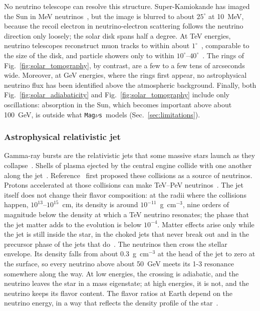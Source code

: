 \documentclass[final,5p,times,twocolumn,sort,compress]{elsarticle}
\makeatletter
\newcommand{\fig}{Fig.}
\DeclareRobustCommand{\_}{%
  \ifmmode\nfss@text{\textunderscore}\else\textunderscore\allowbreak\fi}
\newcommand{\figu}[1]{\fig~\ref{fig:#1}}
\newcommand{\magnus}{{\tt Mag}\ensuremath{\nu}{\tt s}}
\makeatother
\begin{document}
No neutrino telescope can resolve this structure. Super-Kamiokande has imaged the Sun in MeV neutrinos~\cite{Super-Kamiokande:2005wtt}, but the image is blurred to about $25^\circ$ at 10~MeV, because the recoil electron in neutrino-electron scattering follows the neutrino direction only loosely; the solar disk spans half a degree. At TeV energies, neutrino telescopes reconstruct muon tracks to within about $1^\circ$~\cite{IceCube:2019cia}, comparable to the size of the disk, and particle showers only to within $10^\circ$--$40^\circ$~\cite{IceCube:2019lzm}. The rings of \figu{solar_tomography}, by contrast, are a few to a few tens of arcseconds wide. Moreover, at GeV energies, where the rings first appear, no astrophysical neutrino flux has been identified above the atmospheric background. Finally, both \figu{solar_adiabaticity} and \figu{solar_tomography} include only oscillations: absorption in the Sun, which becomes important above about 100~GeV, is outside what \magnus\ models (Sec.~\ref{sec:limitations}).


\subsubsection{Astrophysical relativistic jet}
\label{sec:jet}

Gamma-ray bursts are the relativistic jets that some massive stars launch as they collapse~\cite{Woosley:1993wj, MacFadyen:1998vz, Piran:2004ba, Meszaros:2006rc}. Shells of plasma ejected by the central engine collide with one another along the jet~\cite{Rees:1994nw}. Reference~\cite{Paczynski:1994uv} first proposed these collisions as a source of neutrinos. Protons accelerated at those collisions can make TeV--PeV neutrinos~\cite{Waxman:1997ti, Guetta:2003wi, Murase:2005hy, Hummer:2011ms, Bustamante:2014oka}. The jet itself does not change their flavor composition: at the radii where the collisions happen, $10^{13}$--$10^{15}$~cm, its density is around $10^{-11}$~g~cm$^{-3}$, nine orders of magnitude below the density at which a TeV neutrino resonates; the phase that the jet matter adds to the evolution is below $10^{-4}$. Matter effects arise only while the jet is still inside the star, in the choked jets that never break out and in the precursor phase of the jets that do\ \cite{Mena:2006eq, Razzaque:2009kq, Sahu:2010ap, Varela:2014mma, Xiao:2015gea}. The neutrinos then cross the stellar envelope. Its density falls from about 0.3~g~cm$^{-3}$ at the head of the jet to zero at the surface, so every neutrino above about 50~GeV meets its 1-3 resonance somewhere along the way. At low energies, the crossing is adiabatic, and the neutrino leaves the star in a mass eigenstate; at high energies, it is not, and the neutrino keeps its flavor content. The flavor ratios at Earth depend on the neutrino energy, in a way that reflects the density profile of the star\ \cite{Razzaque:2009kq, Xiao:2015gea}.
\end{document}
